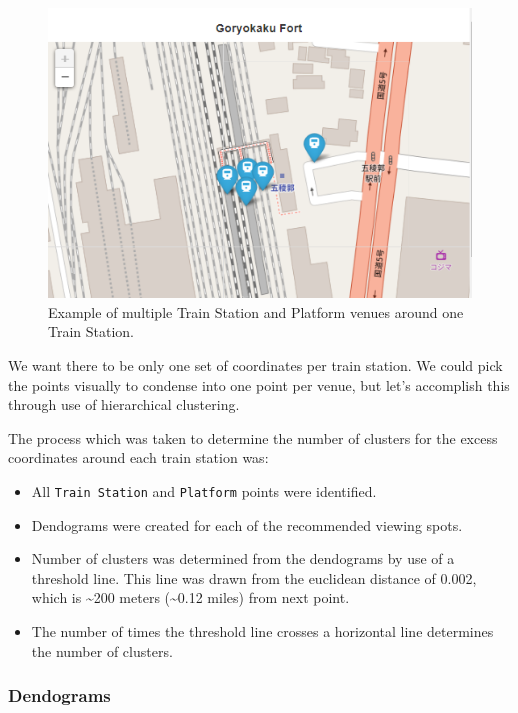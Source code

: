 \documentclass[11pt]{article}
\providecommand{\tightlist}{%
      \setlength{\itemsep}{0pt}\setlength{\parskip}{0pt}}
\begin{document}
\begin{figure}[H]
  \centering
\includegraphics[]{images/TrainClusterExample.png}
\caption{Example of multiple Train Station and Platform venues around one Train Station.}
\end{figure}

We want there to be only one set of coordinates per train station. We could pick the points visually to condense into one point
per venue, but let's accomplish this through use of hierarchical clustering.

The process which was taken to determine the number of clusters for the excess coordinates 
around each train station was:

\begin{itemize}
  \tightlist
  \item All \texttt{Train\ Station} and \texttt{Platform} points were identified. 
  \item Dendograms were created for each of the recommended viewing spots. 
  \item Number of clusters was determined from the dendograms by use of a threshold line. This line was drawn from the euclidean distance of 
  0.002, which is \textasciitilde200 meters (\textasciitilde0.12 miles) from next point. 
  \item The number of times the threshold line crosses a horizontal line determines the number of clusters.
\end{itemize}

    \hypertarget{dendograms}{%
\subsubsection{Dendograms}\label{dendograms}}
\end{document}
